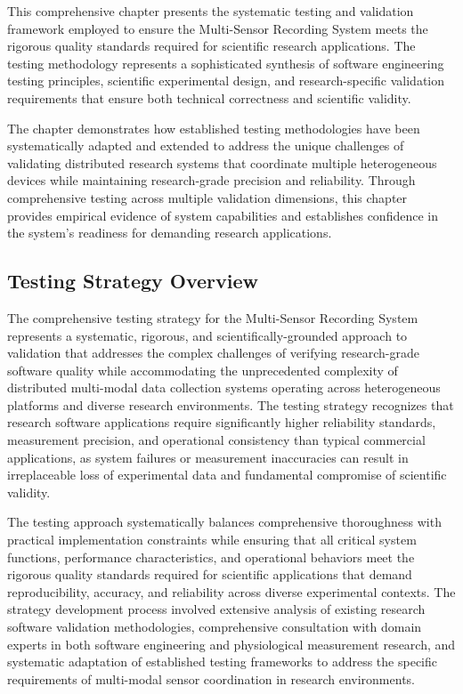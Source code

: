 \documentclass[12pt,a4paper]{report}
\begin{document}
This comprehensive chapter presents the systematic testing and validation framework employed to ensure the Multi-Sensor
Recording System meets the rigorous quality standards required for scientific research applications. The testing
methodology represents a sophisticated synthesis of software engineering testing principles, scientific experimental
design, and research-specific validation requirements that ensure both technical correctness and scientific validity.

The chapter demonstrates how established testing methodologies have been systematically adapted and extended to address
the unique challenges of validating distributed research systems that coordinate multiple heterogeneous devices while
maintaining research-grade precision and reliability. Through comprehensive testing across multiple validation
dimensions, this chapter provides empirical evidence of system capabilities and establishes confidence in the system's
readiness for demanding research applications.

\subsection{Testing Strategy Overview}

The comprehensive testing strategy for the Multi-Sensor Recording System represents a systematic, rigorous, and
scientifically-grounded approach to validation that addresses the complex challenges of verifying research-grade
software quality while accommodating the unprecedented complexity of distributed multi-modal data collection systems
operating across heterogeneous platforms and diverse research environments. The testing strategy recognizes that
research software applications require significantly higher reliability standards, measurement precision, and
operational consistency than typical commercial applications, as system failures or measurement inaccuracies can result
in irreplaceable loss of experimental data and fundamental compromise of scientific validity.

The testing approach systematically balances comprehensive thoroughness with practical implementation constraints while
ensuring that all critical system functions, performance characteristics, and operational behaviors meet the rigorous
quality standards required for scientific applications that demand reproducibility, accuracy, and reliability across
diverse experimental contexts. The strategy development process involved extensive analysis of existing research
software validation methodologies, comprehensive consultation with domain experts in both software engineering and
physiological measurement research, and systematic adaptation of established testing frameworks to address the specific
requirements of multi-modal sensor coordination in research environments.
\end{document}
